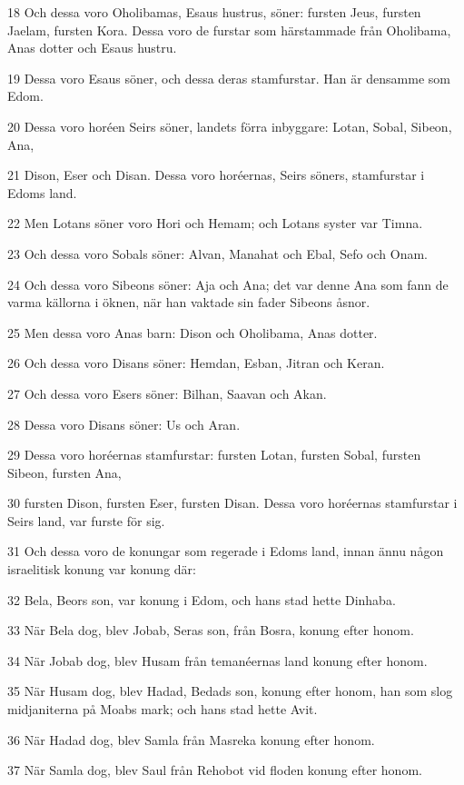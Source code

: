 \par 18 Och dessa voro Oholibamas, Esaus hustrus, söner: fursten Jeus, fursten Jaelam, fursten Kora. Dessa voro de furstar som härstammade från Oholibama, Anas dotter och Esaus hustru.
\par 19 Dessa voro Esaus söner, och dessa deras stamfurstar. Han är densamme som Edom.
\par 20 Dessa voro horéen Seirs söner, landets förra inbyggare: Lotan, Sobal, Sibeon, Ana,
\par 21 Dison, Eser och Disan. Dessa voro horéernas, Seirs söners, stamfurstar i Edoms land.
\par 22 Men Lotans söner voro Hori och Hemam; och Lotans syster var Timna.
\par 23 Och dessa voro Sobals söner: Alvan, Manahat och Ebal, Sefo och Onam.
\par 24 Och dessa voro Sibeons söner: Aja och Ana; det var denne Ana som fann de varma källorna i öknen, när han vaktade sin fader Sibeons åsnor.
\par 25 Men dessa voro Anas barn: Dison och Oholibama, Anas dotter.
\par 26 Och dessa voro Disans söner: Hemdan, Esban, Jitran och Keran.
\par 27 Och dessa voro Esers söner: Bilhan, Saavan och Akan.
\par 28 Dessa voro Disans söner: Us och Aran.
\par 29 Dessa voro horéernas stamfurstar: fursten Lotan, fursten Sobal, fursten Sibeon, fursten Ana,
\par 30 fursten Dison, fursten Eser, fursten Disan. Dessa voro horéernas stamfurstar i Seirs land, var furste för sig.
\par 31 Och dessa voro de konungar som regerade i Edoms land, innan ännu någon israelitisk konung var konung där:
\par 32 Bela, Beors son, var konung i Edom, och hans stad hette Dinhaba.
\par 33 När Bela dog, blev Jobab, Seras son, från Bosra, konung efter honom.
\par 34 När Jobab dog, blev Husam från temanéernas land konung efter honom.
\par 35 När Husam dog, blev Hadad, Bedads son, konung efter honom, han som slog midjaniterna på Moabs mark; och hans stad hette Avit.
\par 36 När Hadad dog, blev Samla från Masreka konung efter honom.
\par 37 När Samla dog, blev Saul från Rehobot vid floden konung efter honom.
